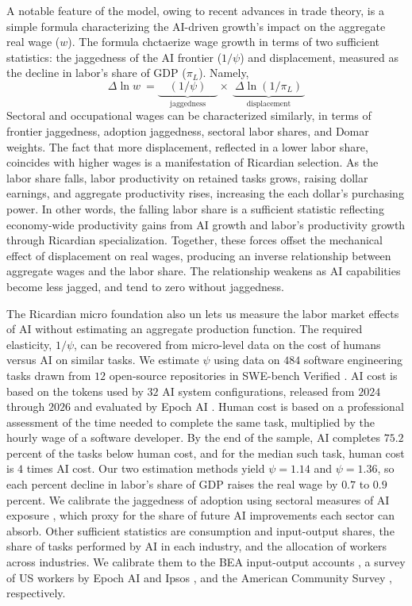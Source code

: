 \documentclass[11pt]{article}
\begin{document}
A notable feature of the model, owing to recent advances in trade
theory, is a simple formula characterizing the AI-driven growth's
impact on the aggregate real wage ($w$). The formula chctaerize wage
growth in terms of two sufficient statistics: the jaggedness of the
AI frontier ($1/\psi$) and displacement, measured as the decline
in labor's share of GDP ($\pi_{L}$). Namely,
\[
\Delta\ln w\ =\underbrace{\quad(1/\psi)\quad}_{\text{jaggedness}}\times\ \underbrace{\ \Delta\ln(1/\pi_{L})\ }_{\text{displacement}}
\]
Sectoral and occupational wages can be characterized similarly, in
terms of frontier jaggedness, adoption jaggedness, sectoral labor
shares, and Domar weights. The fact that more displacement, reflected
in a lower labor share, coincides with higher wages is a manifestation
of Ricardian selection. As the labor share falls, labor productivity
on retained tasks grows, raising dollar earnings, and aggregate productivity
rises, increasing the each dollar's purchasing power. In other words,
the falling labor share is a sufficient statistic reflecting economy-wide
productivity gains from AI growth and labor's productivity growth
through Ricardian specialization. Together, these forces offset the
mechanical effect of displacement on real wages, producing an inverse
relationship between aggregate wages and the labor share. The relationship
weakens as AI capabilities become less jagged, and tend to zero without
jaggedness.

The Ricardian micro foundation also un lets us measure the labor market
effects of AI without estimating an aggregate production function.
The required elasticity, $1/\psi$, can be recovered from micro-level
data on the cost of humans versus AI on similar tasks. We estimate
$\psi$ using data on $484$ software engineering tasks drawn
from $12$ open-source repositories in SWE-bench Verified
\citep{jimenez2024,openai2024verified}. AI cost is based on the tokens
used by $32$ AI system configurations, released from
$2024$ through $2026$ and evaluated
by Epoch AI \citep{epoch2026}. Human cost is based on a professional
assessment of the time needed to complete the same task, multiplied
by the hourly wage of a software developer. By the end of the sample,
AI completes $75.2$ percent of the tasks
below human cost, and for the median such task, human cost is $4$
times AI cost. Our two estimation methods yield $\psi=1.14$
and $\psi=1.36$, so each percent decline in labor's share
of GDP raises the real wage by $0.7$ to $0.9$
percent. We calibrate the jaggedness of adoption using sectoral measures
of AI exposure \citep{emmr2024}, which proxy for the share of future
AI improvements each sector can absorb. Other sufficient statistics
are consumption and input-output shares, the share of tasks performed
by AI in each industry, and the allocation of workers across industries.
We calibrate them to the BEA input-output accounts \citep{bea2026io},
a survey of US workers by Epoch AI and Ipsos \citep{epochpolling2026},
and the American Community Survey \citep{census2024pums}, respectively.
\end{document}

